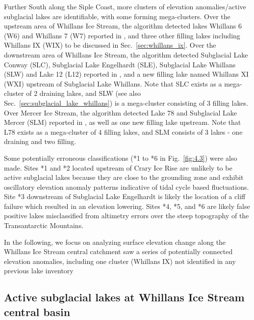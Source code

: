 Further South along the Siple Coast, more clusters of elevation anomalies/active subglacial lakes are identifiable, with some forming mega-clusters.
Over the upstream area of Whillans Ice Stream, the algorithm detected lakes Whillans 6 (W6) and Whillans 7 (W7) reported in \citet{Smithinventoryactivesubglacial2009}, and three other filling lakes including Whillans IX (WIX) to be discussed in Sec.~\ref{sec:whillans_ix}.
Over the downstream area of Whillans Ice Stream, the algorithm detected Subglacial Lake Conway (SLC), Subglacial Lake Engelhardt (SLE), Subglacial Lake Whillans (SLW) and Lake 12 (L12) reported in \citet{FrickerConnectedsubglaciallake2009}, and a new filling lake named Whillans XI (WXI) upstream of Subglacial Lake Whillans.
Note that SLC exists as a mega-cluster of 2 draining lakes, and SLW (see also Sec.~\ref{sec:subglacial_lake_whillans}) is a mega-cluster consisting of 3 filling lakes.
Over Mercer Ice Stream, the algorithm detected Lake 78 \citep[L78; see also][]{SiegfriedThirteenyearssubglacial2018} and Subglacial Lake Mercer (SLM) reported in \citet{FrickerConnectedsubglaciallake2009}, as well as one new filling lake upstream.
Note that L78 exists as a mega-cluster of 4 filling lakes, and SLM consists of 3 lakes - one draining and two filling.

Some potentially erroneous classifications (*1 to *6 in Fig.~\ref{fig:4.3}) were also made.
Sites *1 and *2 located upstream of Crary Ice Rise are unlikely to be active subglacial lakes because they are close to the grounding zone and exhibit oscillatory elevation anomaly patterns indicative of tidal cycle based fluctuations.
Site *3 downstream of Subglacial Lake Engelhardt is likely the location of a cliff failure which resulted in an elevation lowering.
Sites *4, *5, and *6 are likely false positive lakes misclassified from altimetry errors over the steep topography of the Transantarctic Mountains.

In the following, we focus on analyzing surface elevation change along the Whillans Ice Stream central catchment saw a series of potentially connected elevation anomalies, including one cluster (Whillans IX) not identified in any previous lake inventory

\subsection{Active subglacial lakes at Whillans Ice Stream central basin} \label{sec:whillanscentralbasin}

